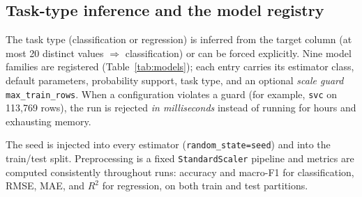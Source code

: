 \subsection{Task-type inference and the model registry}

The task type (classification or regression) is inferred from the target column (at most 20 distinct values $\Rightarrow$ classification) or can be forced explicitly. Nine model families are registered (Table~\ref{tab:models}); each entry carries its estimator class, default parameters, probability support, task type, and an optional \emph{scale guard} \texttt{max\_train\_rows}. When a configuration violates a guard (for example, \texttt{svc} on 113{,}769 rows), the run is rejected \emph{in milliseconds} instead of running for hours and exhausting memory.


\begin{table}[H]
\centering
\caption{Registered model families and their guards.}
\label{tab:models}
\small
{}
\end{table}

The seed is injected into every estimator (\texttt{random\_state=seed}) and into the train/test split. Preprocessing is a fixed \texttt{StandardScaler} pipeline and metrics are computed consistently throughout runs: accuracy and macro-F1 for classification, RMSE, MAE, and $R^2$ for regression, on both train and test partitions.

